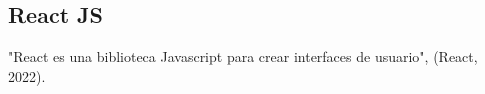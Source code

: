 \subsection{React JS}
"React es una biblioteca Javascript para crear interfaces de usuario", (React, 2022).